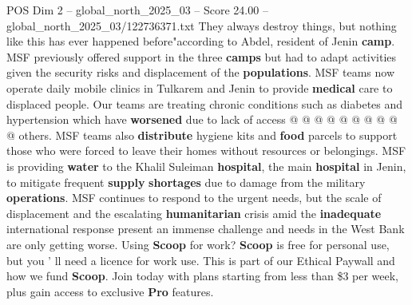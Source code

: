 \begin{textsample}{POS Dim 2 – global\_north\_2025\_03 – Score 24.00 – global\_north\_2025\_03/122736371.txt}
They always destroy things, but nothing like this has ever happened before"according to Abdel, resident of Jenin \textbf{camp}.
MSF previously offered support in the three \textbf{camps} but had to adapt activities given the security risks and displacement of the \textbf{populations}.
MSF teams now operate daily mobile clinics in Tulkarem and Jenin to provide \textbf{medical} care to displaced people.
Our teams are treating chronic conditions such as diabetes and hypertension which have \textbf{worsened} due to lack of access @ @ @ @ @ @ @ @ @ @ others.
MSF teams also \textbf{distribute} hygiene kits and \textbf{food} parcels to support those who were forced to leave their homes without resources or belongings.
MSF is providing \textbf{water} to the Khalil Suleiman \textbf{hospital}, the main \textbf{hospital} in Jenin, to mitigate frequent \textbf{supply} \textbf{shortages} due to damage from the military \textbf{operations}.
MSF continues to respond to the urgent needs, but the scale of displacement and the escalating \textbf{humanitarian} crisis amid the \textbf{inadequate} international response present an immense challenge and needs in the West Bank are only getting worse.
Using \textbf{Scoop} for work? \textbf{Scoop} is free for personal use, but you ' ll need a licence for work use.
This is part of our Ethical Paywall and how we fund \textbf{Scoop}.
Join today with plans starting from less than \$3 per week, plus gain access to exclusive \textbf{Pro} features.

\end{textsample}
